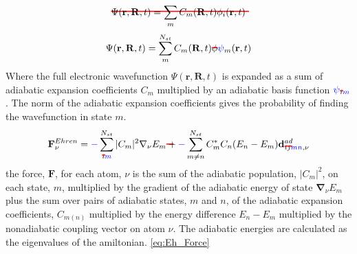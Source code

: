 {\color{red} \begin{equation*}
	\mremove[red]{\Psi(\mathbf{r}, \mathbf{R}, t) = \sum_{m} C_{m}(\mathbf{R}, t) \phi_i(\mathbf{r}, t)}
\end{equation*}
}
\begin{equation}
	\Psi(\mathbf{r}, \mathbf{R}, t) = \sum_{m}^{N_{st}} C_{m}(\mathbf{R}, t) \mremove{\phi}\madd{\psi}_{m}(\mathbf{r}, t)
	\label{eq:BornHuangExpansion}
\end{equation}
Where the full electronic wavefunction $\Psi(\mathbf{r}, \mathbf{R}, t)$ is expanded as a sum of adiabatic expansion coefficients $C_{m}$ multiplied by an adiabatic basis function \mremove{$\phi$}$\madd{\psi}_{\mremove{i}\madd{m}}$.  The norm of the adiabatic expansion coefficients gives the probability of finding the wavefunction in state $m$.
\begin{equation}
	\mathbf{F}_{\nu}^{Ehren} = \madd{-}\sum_{\mremove{i}\madd{m}}^{N_{st}} |C_{m}|^2 \mathbf{\nabla}_{\nu} E_{m} \mremove{+}\madd{-} \sum_{m \neq n}^{N_{st}} C_{m}^{*} C_{n} (E_{n} - E_{m}) \mathbf{d}_{\mremove{ij}\madd{mn}, \nu}^{ad}
  \label{eq:Eh_Force}
\end{equation}
 the force, $\mathbf{F}$, for each atom, $\nu$\add{,} is the sum of the adiabatic population, $|C_{m}|^2$, on each state, $m$, multiplied by the gradient of the adiabatic energy of state $\mathbf{\nabla}_{\nu}E_{m}$ plus the sum over pairs of adiabatic states, $m$ and $n$, of the adiabatic expansion coefficients, $C_{m (n)}$ multiplied by the energy difference $E_{n} - E_{m}$ multiplied by the nonadiabatic coupling vector  on atom $\nu$. The adiabatic energies are calculated as the eigenvalues of the amiltonian.\textcolor{blue}{ \eqref{eq:Eh_Force} }
